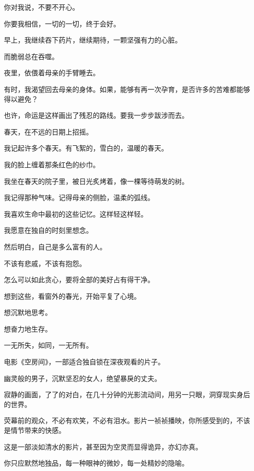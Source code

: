 \documentclass[12pt,a4paper]{article}
\def\blankrev{\vspace{1ex}}									%
\begin{document}
		你对我说，不要不开心。\par
		你要我相信，一切的一切，终于会好。\par
		早上，我继续吞下药片，继续期待，一颗坚强有力的心脏。\par
		而脆弱总在吞噬。\par
		夜里，依偎着母亲的手臂睡去。\par
		有时，我渴望回去母亲的身体。如果，能够有再一次孕育，是否许多的苦难都能够得以避免？\par
		也许，命运是这样画出了残忍的路线。要我一步步跋涉而去。\par
		春天，在不远的日期上招摇。\par
		我记起许多个春天。有飞絮的，雪白的，温暖的春天。\par
		我的脸上缠着那条红色的纱巾。\par
		我坐在春天的院子里，被日光炙烤着，像一棵等待萌发的树。\par
		我记得那种气味。记得母亲的侧脸，温柔的弧线。\par
		我喜欢生命中最初的这些记忆。这样轻这样轻。\par
		我愿意在独自的时刻里想念。\par
		然后明白，自己是多么富有的人。\par
		不该有悲戚，不该有抱怨。\par
		怎么可以如此贪心，要将全部的美好占有得干净。\par
		想到这些，看窗外的春光，开始平复了心境。\par
		想沉默地思考。\par
		想奋力地生存。

	\endwriting



		一无所失，如同，一无所有。


		\blankrev
		电影《空房间》，一部适合独自锁在深夜观看的片子。\par
		幽灵般的男子，沉默坚忍的女人，绝望暴戾的丈夫。\par
		寂静的画面，了了的对白，在几十分钟的光影流动间，用另一只眼，洞穿现实身后的世界。\par
		荧幕前的观众，不必有欢笑，不必有泪水。影片一祯祯播映，你所感受到的，不该是情节带来的快感。\par
		这是一部淡如清水的影片，甚至因为空灵而显得诡异，亦幻亦真。\par
		你只应默然地独品，每一种眼神的微妙，每一处精妙的隐喻。
\end{document}
